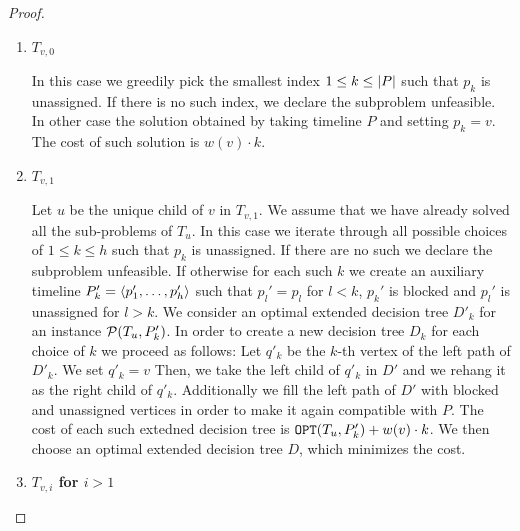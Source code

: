 \begin{theorem}
\begin{proof}


    \begin{enumerate}
        \item \textbf{$T_{v,0}$}
        
            In this case we greedily pick the smallest index $1 \leq k \leq \mathopen{}\left| P \right|$ such that $p_k$ is unassigned. If there is no such index, we declare the subproblem unfeasible. In other case the solution obtained by taking timeline $P$ and setting $p_k=v$. The cost of such solution is $w(v)\cdot k$.
        \item \textbf{$T_{v,1}$}
        
        Let $u$ be the unique child of $v$ in $T_{v,1}$. We assume that we have already solved all the sub-problems of $T_u$.
            In this case we iterate through all possible choices of $1\leq k \leq h$ such that $p_k$ is unassigned. If there are no such we declare the subproblem unfeasible. If otherwise for each such $k$ we create an auxiliary timeline $P_k'=
            \mathopen{}\langle p_1',\dots,p_h' \rangle$ such that $p_l'=p_l$ for $l < k$, $p_k'$ is blocked and $p_l'$ is unassigned for $l>k$. We consider an optimal extended decision tree $D'_k$ for an instance $\mathcal{P}\mathopen{}\left( T_{u}, P_k' \right)$. In order to create a new decision tree $D_k$ for each choice of $k$ we proceed as follows: Let $q'_k$ be the $k$-th vertex of the left path of $D'_k$. We set $q'_k=v$ Then, we take the left child of $q'_k$ in $D'$ and we rehang it as the right child of $q'_k$. Additionally we fill the left path of $D'$ with blocked and unassigned vertices in order to make it again compatible with $P$.
            The cost of each such extedned decision tree is $\texttt{OPT}\mathopen{}\left( T_{u}, P_k' \right)+w(v)\cdot k$. We then choose an optimal extended decision tree $D$, which minimizes the cost.
        \item \textbf{$T_{v,i}$ for $i>1$}
        

\end{enumerate}
\end{proof}
\end{theorem}
